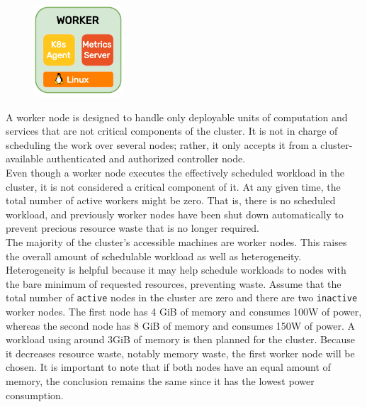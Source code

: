 \begin{figure}
  \centering
  \includegraphics[width=\linewidth]{images/architecture/worker.pdf}
\end{figure}

A worker node is designed to handle only deployable units of computation and services
that are not critical components of the cluster. It is not in charge of
scheduling the work over several nodes; rather, it only accepts it from a
cluster-available authenticated and authorized controller node. \\ %
Even though a worker node executes the effectively scheduled workload in the
cluster, it is not considered a critical component of it. At any given time, the
total number of active workers might be zero. That is, there is no scheduled workload,
and previously worker nodes have been shut down automatically to prevent
precious resource waste that is no longer required. \\ %
The majority of the cluster's accessible machines are worker nodes. This raises the
overall amount of schedulable workload as well as heterogeneity. Heterogeneity
is helpful because it may help schedule workloads to nodes with the bare minimum
of requested resources, preventing waste. Assume that the total number of
\texttt{active} nodes in the cluster are zero and there are two \texttt{inactive}
worker nodes. The first node has 4 GiB of memory and consumes 100W of power,
whereas the second node has 8 GiB of memory and consumes 150W of power. A workload
using around 3GiB of memory is then planned for the cluster. Because it
decreases resource waste, notably memory waste, the first worker node will be
chosen. It is important to note that if both nodes have an equal amount of memory,
the conclusion remains the same since it has the lowest power consumption.

